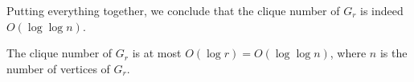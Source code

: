 \documentclass[a4paper,english,cleveref,thm-restate]{lipics-v2021}
\newcommand{\thomas}[1]{\todo[linecolor=blue!25,backgroundcolor=blue!25]{\footnotesize#1}}
\begin{document}

Putting everything together, we conclude that the clique number of $ G_r $ is indeed $ O(\log \log n) $.

\begin{lemma}\label{lem:Gr_clique_loglogn}
    The clique number of $ G_r $ is at most $ O(\log r) = O(\log \log n) $, where $ n $ is the number of vertices of $ G_r $.
\end{lemma}
\end{document}
